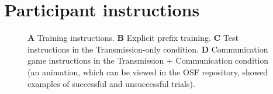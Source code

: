 \documentclass[doc,biblatex]{apa7}
\begin{document}



\printbibliography


\clearpage

\appendix

\section{Participant instructions}

\begin{figure}[h!]
\vspace*{2pt}
\caption{\textbf{A} Training instructions. \textbf{B} Explicit prefix training. \textbf{C} Test instructions in the Transmission-only condition. \textbf{D} Communication game instructions in the Transmission + Communication condition (an animation, which can be viewed in the OSF repository, showed examples of successful and unsuccessful trials).}
\label{supp_training}
\end{figure}
\end{document}
